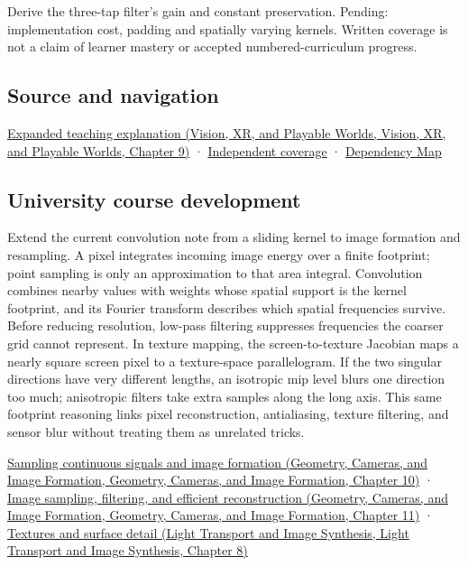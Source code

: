 Derive the three-tap filter's gain and constant preservation. Pending: implementation cost, padding and spatially varying kernels. Written coverage is not a claim of learner mastery or accepted numbered-curriculum progress.

\subsection{Source and navigation}\label{appendix-d5b3c692d9f0-source-and-navigation}

\href{../07-Vision-XR-and-Playable-Worlds/main.pdf\#nameddest=04-visual-computing-ii-ch042-a-footprint-is-more-meaningful-than-an-isolated-pixel-center}{Expanded teaching explanation (Vision, XR, and Playable Worlds, Vision, XR, and Playable Worlds, Chapter 9)} · \hyperref[appendix-fd090d982a15-xr01---independent-seeing-and-representation-source]{Independent coverage} · \hyperref[appendix-4ad47bdd269a]{Dependency Map}

\subsection{University course development}\label{appendix-d5b3c692d9f0-university-course-development}

Extend the current convolution note from a sliding kernel to image formation and resampling. A pixel integrates incoming image energy over a finite footprint; point sampling is only an approximation to that area integral. Convolution combines nearby values with weights whose spatial support is the kernel footprint, and its Fourier transform describes which spatial frequencies survive. Before reducing resolution, low-pass filtering suppresses frequencies the coarser grid cannot represent. In texture mapping, the screen-to-texture Jacobian maps a nearly square screen pixel to a texture-space parallelogram. If the two singular directions have very different lengths, an isotropic mip level blurs one direction too much; anisotropic filters take extra samples along the long axis. This same footprint reasoning links pixel reconstruction, antialiasing, texture filtering, and sensor blur without treating them as unrelated tricks.

\href{../03-Geometry-Cameras-and-Image-Formation/main.pdf\#nameddest=03-visual-computing-i-ch003-sampling-continuous-signals-and-image-formation}{Sampling continuous signals and image formation (Geometry, Cameras, and Image Formation, Geometry, Cameras, and Image Formation, Chapter 10)} · \href{../03-Geometry-Cameras-and-Image-Formation/main.pdf\#nameddest=03-visual-computing-i-ch004-image-sampling-filtering-and-efficient-reconstruction}{Image sampling, filtering, and efficient reconstruction (Geometry, Cameras, and Image Formation, Geometry, Cameras, and Image Formation, Chapter 11)} · \href{../04-Light-Transport-and-Image-Synthesis/main.pdf\#nameddest=03-visual-computing-i-ch019-textures-and-surface-detail}{Textures and surface detail (Light Transport and Image Synthesis, Light Transport and Image Synthesis, Chapter 8)}
